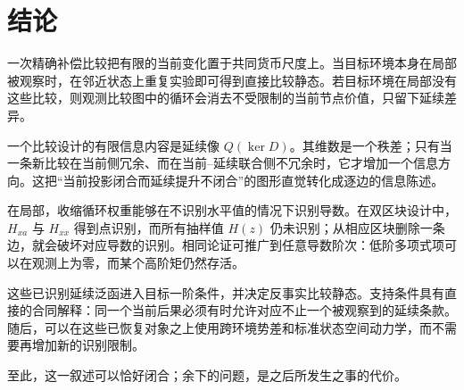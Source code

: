 \section{结论}

一次精确补偿比较把有限的当前变化置于共同货币尺度上。当目标环境本身在局部被观察时，在邻近状态上重复实验即可得到直接比较静态。若目标环境在局部没有这些比较，则观测比较图中的循环会消去不受限制的当前节点价值，只留下延续差异。

一个比较设计的有限信息内容是延续像 $Q(\ker D)$。其维数是一个秩差；只有当一条新比较在当前侧冗余、而在当前--延续联合侧不冗余时，它才增加一个信息方向。这把“当前投影闭合而延续提升不闭合”的图形直觉转化成逐边的信息陈述。

在局部，收缩循环权重能够在不识别水平值的情况下识别导数。在双区块设计中，$H_{xa}$ 与 $H_{xx}$ 得到点识别，而所有抽样值 $H(z)$ 仍未识别；从相应区块删除一条边，就会破坏对应导数的识别。相同论证可推广到任意导数阶次：低阶多项式项可以在观测上为零，而某个高阶矩仍然存活。

这些已识别延续泛函进入目标一阶条件，并决定反事实比较静态。支持条件具有直接的合同解释：同一个当前后果必须有时允许对应不止一个被观察到的延续条款。随后，可以在这些已恢复对象之上使用跨环境势差和标准状态空间动力学，而不需要再增加新的识别限制。

至此，这一叙述可以恰好闭合；余下的问题，是之后所发生之事的代价。
